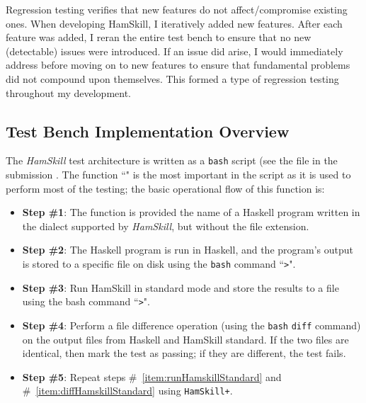 \documentclass{report}
\begin{document}
Regression testing verifies that new features do not affect/compromise existing ones.  When developing HamSkill, I iteratively added new features.  After each feature was added, I reran the entire test bench to ensure that no new (detectable) issues were introduced.  If an issue did arise, I would immediately address before moving on to new features to ensure that fundamental problems did not compound upon themselves. This formed a type of regression testing throughout my development.

\subsection{Test Bench Implementation Overview}

The \textit{HamSkill} test architecture is written as a \texttt{bash} script (see the file in the submission .  The function ``" is the most important in the script as it is used to perform most of the testing; the basic operational flow of this function is:

\begin{itemize}

\item \textbf{Step \#1}: The function is provided the name of a Haskell program written in the dialect supported by \textit{HamSkill}, but without the file extension.

\item \textbf{Step \#2}: The Haskell program is run in Haskell, and the program's output is stored to a specific file on disk using the \texttt{bash} command ``\texttt{>}". 

\item\label{item:runHamskillStandard} \textbf{Step \#3}: Run HamSkill in standard mode and store the results to a file using the bash command ``\texttt{>}". 

\item\label{item:diffHamskillStandard} \textbf{Step \#4}: Perform a file difference operation (using the \texttt{bash} \texttt{diff} command) on the output files from Haskell and HamSkill standard.  If the two files are identical, then mark the test as passing; if they are different, the test fails.
 
\item \textbf{Step \#5}: Repeat steps \#~\ref{item:runHamskillStandard} and \#~\ref{item:diffHamskillStandard} using \texttt{HamSkill+}.

\end{itemize}
\end{document}

